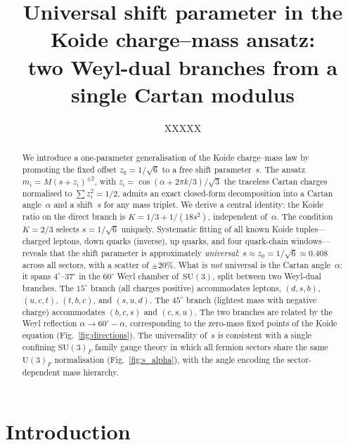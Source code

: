 \documentclass[preprint,12pt]{elsarticle}
\newcommand{\SU}{\mathrm{SU}}
\newcommand{\UU}{\mathrm{U}}
\begin{document}
\begin{frontmatter}

\title{Universal shift parameter in the Koide charge--mass ansatz:\\
two Weyl-dual branches from a single Cartan modulus}

\author{XXXXX}
\address{XXXXX}

\begin{abstract}
We introduce a one-parameter generalisation of the Koide
charge--mass law by promoting the fixed offset $z_0 = 1/\sqrt{6}$
to a free shift parameter~$s$.  The ansatz
$m_i = M(s + z_i)^{\pm 2}$, with $z_i = \cos(\alpha + 2\pi k/3)/\sqrt{3}$
the traceless Cartan charges normalised to $\sum z_i^2 = 1/2$,
admits an exact closed-form decomposition into a Cartan
angle~$\alpha$ and a shift~$s$ for any mass triplet.  We derive
a central identity: the Koide ratio on the direct branch is
$K = 1/3 + 1/(18 s^2)$, independent of~$\alpha$.  The condition
$K = 2/3$ selects $s = 1/\sqrt{6}$ uniquely.  Systematic fitting
of all known Koide tuples---charged leptons, down quarks
(inverse), up quarks, and four quark-chain windows---reveals that
the shift parameter is approximately \emph{universal}:
$s \approx z_0 = 1/\sqrt{6} \approx 0.408$ across all sectors,
with a scatter of $\pm 20\%$.  What is \emph{not} universal is
the Cartan angle~$\alpha$: it spans $4^\circ$--$37^\circ$ in
the $60^\circ$ Weyl chamber of~$\SU(3)$, split between two
Weyl-dual branches.  The $15^\circ$ branch (all charges positive)
accommodates leptons, $(d,s,b)$, $(u,c,t)$, $(t,b,c)$, and $(s,u,d)$.
The $45^\circ$ branch (lightest mass with negative charge)
accommodates $(b,c,s)$ and $(c,s,u)$.
The two branches are related by the Weyl reflection
$\alpha \to 60^\circ - \alpha$, corresponding to the
zero-mass fixed points of the Koide equation (Fig.~\ref{fig:directions}).
The universality of~$s$ is consistent with a single
confining $\SU(3)_F$ family gauge theory in which all fermion
sectors share the same $\UU(3)_F$ normalisation
(Fig.~\ref{fig:s_alpha}), with the angle encoding the
sector-dependent mass hierarchy.
\end{abstract}

\end{frontmatter}

\section{Introduction}
\label{sec:intro}
\end{document}
